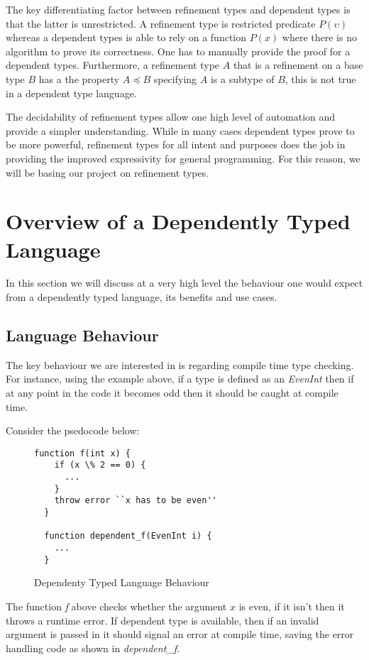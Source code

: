 \documentclass[a4paper,12pt]{report}
\begin{document}
\par
The key differentiating factor between refinement types and dependent types is 
that the latter is unrestricted. A refinement type is restricted predicate 
$P(\upsilon)$ whereas a dependent types is able to rely on a function $P(x)$ 
where there is no algorithm to prove its correctness. One has to manually 
provide the proof for a dependent types. Furthermore, a refinement type $A$ 
that is a refinement on a base type $B$ has a the property $A \preceq B$ 
specifying $A$ is a subtype of $B$, this is not true in a dependent type 
language.

\par
The decidability of refinement types allow one high level of automation and 
provide a simpler understanding. While in many cases dependent types prove to be 
more powerful, refinement types for all intent and purposes does the job in 
providing the improved expressivity for general programming. For this reason, we 
will be basing our project on refinement types. 

\section{Overview of a Dependently Typed Language}
In this section we will discuss at a very high level the behaviour one would 
expect from a dependently typed language, its benefits and use cases.

\subsection{Language Behaviour}
The key behaviour we are interested in is regarding compile time type checking. 
For instance, using the example above, if a type is defined as an \textit{EvenInt} 
then if at any point in the code it becomes odd then it should be caught at 
compile time. 

\par
Consider the psedocode below: 
\begin{figure}[H]
  \begin{lstlisting}[mathescape=true] 
  function f(int x) {
    if (x \% 2 == 0) {
      ...
    }
    throw error ``x has to be even''
  }
  
  function dependent_f(EvenInt i) {
    ...
  }
  \end{lstlisting}
  \caption{Dependenty Typed Language Behaviour}
\end{figure}

\par
The function \textit{f} above checks whether the argument $x$ is even, if it 
isn't then it throws a runtime error. If dependent type is available, then if an 
invalid argument is passed in it should signal an error at compile time, saving the 
error handling code as shown in \textit{dependent\_f}. 
\end{document}

